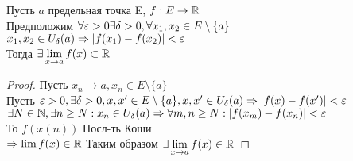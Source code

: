 \begin{theorem}
	Пусть $ a $ предельная точка E, $ f : E \rightarrow \mathbb{R} $ \\
	Предположим $ \forall \varepsilon > 0 \exists \delta > 0, \forall x_1, x_2 \in E \setminus \{a\} $ \\
	$ x_1, x_2 \in U_{\delta} (a) \Rightarrow |f(x_1) - f(x_2)| < \varepsilon $ \\
	Тогда $\exists \lim\limits_{x \rightarrow a} f(x) \subset \mathbb{R} $ \\
	\begin{proof}
		Пусть	$ x_n \rightarrow a, x_n \in E \setminus \{a\}$ \\
		Пусть $ \varepsilon > 0, \exists \delta > 0, x, x' \in E \setminus \{a\}, x, x' \in U_{\delta} (a) \Rightarrow |f(x) - f(x')| < \varepsilon $ \\
		$ \exists N \in \mathbb{N}, \exists n \geq N : x_n \in U_{\delta} (a) \Rightarrow \\
		\forall m, n \geq N : |f(x_m) - f(x_n)| < \varepsilon  $ \\
		То $ f(x(n)) $ Посл-ть Коши \\
		$ \Rightarrow \lim f(x) \in \mathbb{R}$
		Таким образом $ \exists \lim\limits_{x \rightarrow a} f(x) \in \mathbb{R} $
	\end{proof}
\end{theorem}



